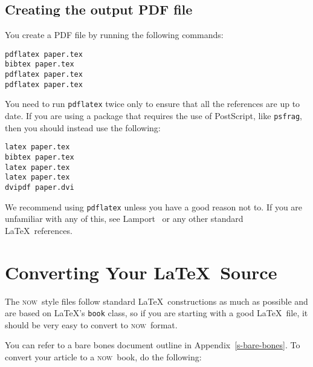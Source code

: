 \documentclass[openany]{now} %
\newcommand{\now}{\textsc{now}}
\begin{document}
\section{Creating the output PDF file}
You create a PDF file by running the following commands:
\begin{verbatim}
pdflatex paper.tex
bibtex paper.tex
pdflatex paper.tex
pdflatex paper.tex
\end{verbatim}
You need to run \texttt{pdflatex} twice only to ensure that all the references are
up to date. If you are using a package that requires the use of PostScript, like
\texttt{psfrag}, then you should instead use the following:
\begin{verbatim}
latex paper.tex
bibtex paper.tex
latex paper.tex
latex paper.tex
dvipdf paper.dvi
\end{verbatim}
We recommend using \texttt{pdflatex} unless you have a good reason not to.
If you are unfamiliar with any of this, see Lamport~\citep{Lam:94} or any
other standard \LaTeX\ references.
\fi

\chapter{Converting Your \LaTeX\ Source}
\label{c-converting}

The \now\ style files follow standard \LaTeX\ constructions as much as possible
and are based on \LaTeX's \texttt{book} class,
so if you are starting with a good \LaTeX\ file, it should be very easy
to convert to \now\ format.

You can refer to a bare bones document outline in Appendix~\ref{s-bare-bones}.
To convert your article to a \now\ book, do the following:
\end{document}
